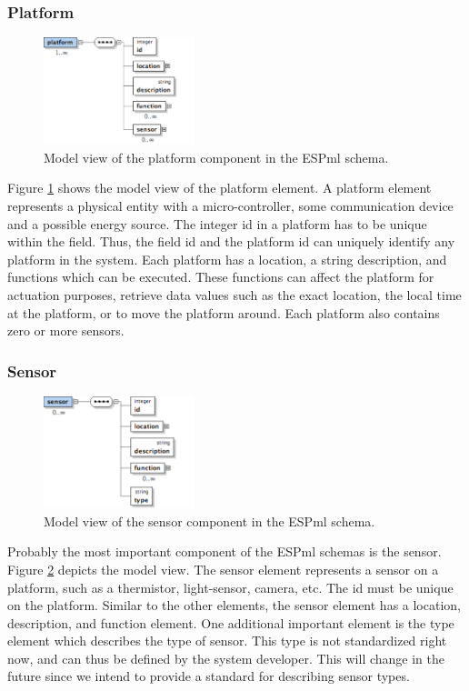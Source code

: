 \subsubsection{Platform}
\begin{figure}[t]
  \begin{center}
    \includegraphics[width=0.39\textwidth]{images/platform}
    \caption{Model view of the platform component in the ESPml schema.}
    \label{fig:platform}
  \end{center}
\end{figure}
Figure \ref{fig:platform} shows the model view of the platform
element. A platform element represents a physical entity with a
micro-controller, some communication device and a possible energy
source. The integer id in a platform has to be unique within the
field. Thus, the field id and the platform id can uniquely identify
any platform in the system. Each platform has a location, a
string description, and functions which can be executed.  These functions can 
affect the
platform for actuation purposes, retrieve data values such as the exact
location, the local time at the platform, or to move the platform
around. Each platform also contains zero or more sensors.


\subsubsection{Sensor}
\begin{figure}[t]
  \begin{center}
    \includegraphics[width=0.39\textwidth]{images/sensor}
    \caption{Model view of the sensor component in the ESPml schema.}
    \label{fig:sensor}
  \end{center}
\end{figure}
Probably the most important component of the ESPml schemas is the sensor. 
Figure \ref{fig:sensor} depicts the model view. The sensor
element represents a sensor on a platform, such as a thermistor,
light-sensor, camera, etc. The id must be unique on the
platform. Similar to the other elements, the sensor element has a
location, description, and function element. One additional important
element is the type element which describes the type of sensor. This
type is not standardized right now, and can thus be defined by the system
developer.  This will change in the future since we intend to provide a standard for describing
sensor types.

